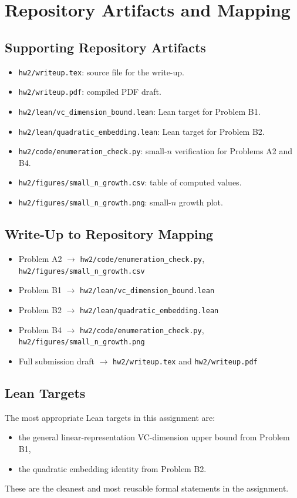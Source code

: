 \documentclass{article}
\begin{document}
\section{Repository Artifacts and Mapping}

\subsection{Supporting Repository Artifacts}

\begin{itemize}[leftmargin=2.5em]
    \item \texttt{hw2/writeup.tex}: source file for the write-up.
    \item \texttt{hw2/writeup.pdf}: compiled PDF draft.
    \item \texttt{hw2/lean/vc\_dimension\_bound.lean}: Lean target for Problem B1.
    \item \texttt{hw2/lean/quadratic\_embedding.lean}: Lean target for Problem B2.
    \item \texttt{hw2/code/enumeration\_check.py}: small-\(n\) verification for
    Problems A2 and B4.
    \item \texttt{hw2/figures/small\_n\_growth.csv}: table of computed values.
    \item \texttt{hw2/figures/small\_n\_growth.png}: small-\(n\) growth plot.
\end{itemize}

\subsection{Write-Up to Repository Mapping}

\begin{itemize}[leftmargin=2.5em]
    \item Problem A2 \(\rightarrow\)
    \texttt{hw2/code/enumeration\_check.py},
    \texttt{hw2/figures/small\_n\_growth.csv}
    \item Problem B1 \(\rightarrow\)
    \texttt{hw2/lean/vc\_dimension\_bound.lean}
    \item Problem B2 \(\rightarrow\)
    \texttt{hw2/lean/quadratic\_embedding.lean}
    \item Problem B4 \(\rightarrow\)
    \texttt{hw2/code/enumeration\_check.py},
    \texttt{hw2/figures/small\_n\_growth.png}
    \item Full submission draft \(\rightarrow\)
    \texttt{hw2/writeup.tex} and \texttt{hw2/writeup.pdf}
\end{itemize}

\subsection{Lean Targets}

The most appropriate Lean targets in this assignment are:
\begin{itemize}[leftmargin=2.5em]
    \item the general linear-representation VC-dimension upper bound from
    Problem B1,
    \item the quadratic embedding identity from Problem B2.
\end{itemize}
These are the cleanest and most reusable formal statements in the assignment.
\end{document}
